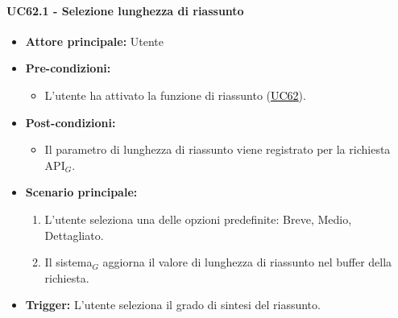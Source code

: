 \documentclass[a4paper, 10pt]{article}
\newcommand{\uclink}[2]{\hyperlink{#1}{\textcolor{black}{\underline{#2}}}}
\begin{document}
\paragraph{UC62.1 - Selezione lunghezza di riassunto}
\hypertarget{uc:62.1}{}
\begin{itemize}
    \item \textbf{Attore principale:} Utente
    \item \textbf{Pre-condizioni:}
        \begin{itemize}
            \item L'utente ha attivato la funzione di riassunto (\uclink{uc:62}{UC62}).
        \end{itemize}
    \item \textbf{Post-condizioni:} 
        \begin{itemize}
            \item Il parametro di lunghezza di riassunto viene registrato per la richiesta API$_G$.
        \end{itemize}
    \item \textbf{Scenario principale:}
        \begin{enumerate}
            \item L'utente seleziona una delle opzioni predefinite: Breve, Medio, Dettagliato.
            \item Il sistema$_G$ aggiorna il valore di lunghezza di riassunto nel buffer della richiesta.
        \end{enumerate}
    \item \textbf{Trigger:} L'utente seleziona il grado di sintesi del riassunto.
\end{itemize}

\hypertarget{uc:63}{}
\end{document}
